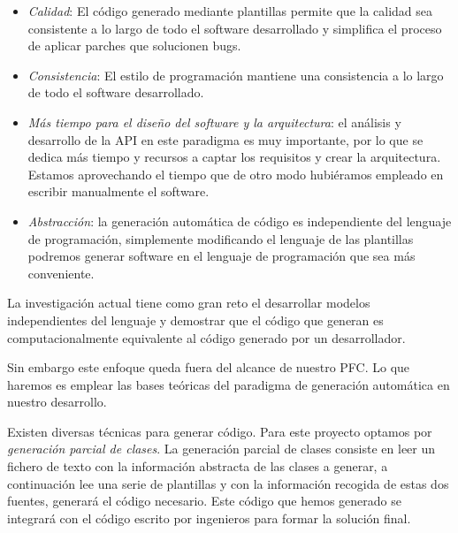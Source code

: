 \begin{itemize}
	\item \textit{Calidad}: El código generado mediante plantillas permite que la calidad sea consistente a lo largo de todo 	el software desarrollado y simplifica el proceso de aplicar parches que solucionen bugs. 
	\item \textit{Consistencia}: El estilo de programación mantiene una consistencia a lo largo de todo el software desarrollado.
	\item \textit{Más tiempo para el diseño del software y la arquitectura}: el análisis y desarrollo de la API en este paradigma es muy importante, por lo que se dedica más tiempo y recursos a captar los requisitos y crear la arquitectura. Estamos aprovechando el tiempo que de otro modo hubiéramos empleado en escribir manualmente el software.
	\item \textit{Abstracción}: la generación automática de código es independiente del lenguaje de programación, simplemente modificando el lenguaje de las plantillas podremos generar software en el lenguaje de programación que sea más conveniente. 
\end{itemize}
\medskip\par

La investigación actual tiene como gran reto el desarrollar modelos independientes del lenguaje y demostrar que el código que generan es computacionalmente equivalente al código generado por un desarrollador.\par
Sin embargo este enfoque queda fuera del alcance de nuestro PFC. Lo que haremos es emplear las bases teóricas del paradigma de generación automática en nuestro desarrollo.\medskip\par
Existen diversas técnicas para generar código. Para este proyecto optamos por \emph{generación parcial de clases}. La generación parcial de clases consiste en leer un fichero de texto con la información abstracta de las clases a generar, a continuación lee una serie de plantillas y con la información recogida de estas dos fuentes, generará el código necesario. Este código que hemos generado se integrará con el código escrito por ingenieros para formar la solución final.\par

